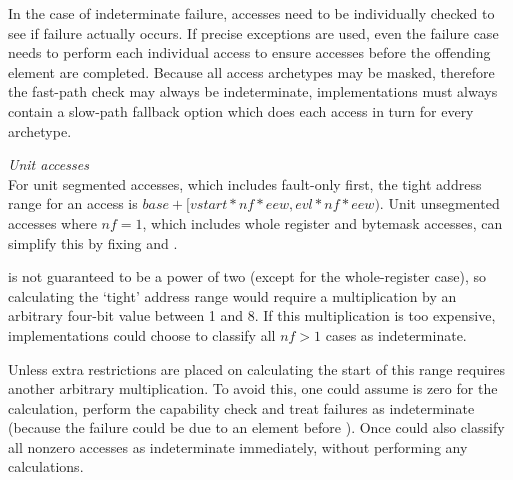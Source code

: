 
In the case of indeterminate failure, accesses need to be individually checked to see if failure actually occurs.
If precise exceptions are used, even the failure case needs to perform each individual access to ensure accesses before the offending element are completed.
Because all access archetypes may be masked, therefore the fast-path check may always be indeterminate, implementations must always contain a slow-path fallback option which does each access in turn for every archetype.


\noindent\emph{Unit accesses}\\
\noindent For unit segmented accesses, which includes fault-only first, the tight address range for an access is
$base + [vstart * nf * eew, evl * nf * eew)$.
Unit unsegmented accesses where $nf = 1$, which includes whole register and bytemask accesses, can simplify this by fixing  and .

 is not guaranteed to be a power of two (except for the whole-register case), so calculating the `tight' address range would require a multiplication by an arbitrary four-bit value between 1 and 8.
If this multiplication is too expensive, implementations could choose to classify all $nf > 1$ cases as indeterminate.

Unless extra restrictions are placed on  calculating the start of this range requires another arbitrary multiplication.
To avoid this, one could assume  is zero for the calculation, perform the capability check and treat failures as indeterminate (because the failure could be due to an element before ).
Once could also classify all nonzero  accesses as indeterminate immediately, without performing any calculations.


